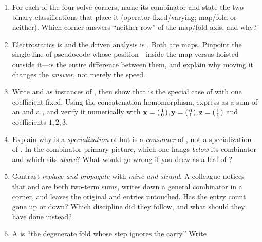 \exercisessection
\begin{enumerate}[nosep]
  \item For each of the four solve corners, name its combinator and state the two
  binary classifications that place it (operator fixed/varying; map/fold or
  neither). Which corner answers ``neither row'' of the map/fold axis, and why?
  \item Electrostatics is  and the driven analysis is
  . Both are maps. Pinpoint the single line of pseudocode
  whose position---inside the map versus hoisted outside it---is the entire
  difference between them, and explain why moving it changes the \emph{answer}, not
  merely the speed.
  \item Write  and  as instances of ,
  then show that  is the special case of  with one
  coefficient fixed. Using the concatenation-homomorphism, express 
  as a sum of an  and a , and verify it numerically with
  $\mathbf{x}=\begin{psmallmatrix}1\\0\end{psmallmatrix},
  \mathbf{y}=\begin{psmallmatrix}0\\1\end{psmallmatrix},
  \mathbf{z}=\begin{psmallmatrix}1\\1\end{psmallmatrix}$ and coefficients $1, 2, 3$.
  \item Explain why  is a \emph{specialization} of 
  but  is a \emph{consumer} of , not a specialization of
  . In the combinator-primary picture, which one hangs
  \emph{below} its combinator and which sits \emph{above}? What would go wrong if
  you drew  as a leaf of ?
  \item Contrast \emph{replace-and-propagate} with \emph{mine-and-strand}. A
  colleague notices that  and  are both two-term sums, writes
  down a general  combinator in a corner, and leaves the original
   and  entries untouched. Has the entry count gone up or
  down? Which discipline did they follow, and what should they have done instead?
  \item A  is ``the degenerate fold whose step ignores the carry.'' Write

\end{enumerate}
